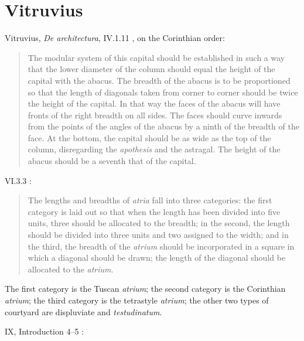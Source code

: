 \documentclass{amsart}
\theoremstyle{definition}
\begin{document}
\section{Vitruvius}
Vitruvius, {\em De architectura}, IV.1.11 \cite[p.~93]{vitruvius}, on the Corinthian order:

\begin{quote}
The modular system of this capital should be established in such a way that the lower diameter of the column should equal the height of the capital
with the abacus. The breadth of the abacus is to be proportioned so that the length of diagonals taken from corner to corner should be twice the height of the
capital. In that way the faces of the abacus will have fronts of the right breadth on all sides. The faces should curve inwards from the points of the angles of the abacus
by a ninth of the breadth of the face. At the bottom, the capital should be as wide as the top of the column, disregarding the {\em apothesis} and the astragal.
The height of the abacus should be a seventh that of the capital.
\end{quote}

VI.3.3 \cite[p.~172]{vitruvius}:

\begin{quote}
The lengths and breadths of {\em atria} fall into three categories: the first category is laid out so that when the length
has been divided into five units, three should be allocated to the breadth; in the second, the length should be divided
into three units and two assigned to the width; and in the third, the breadth of the {\em atrium} should be incorporated
in a square in which a diagonal should be drawn; the length of the diagonal should be allocated to the
{\em atrium}.
\end{quote}

The first category is the Tuscan {\em atrium}; the second category is the Corinthian {\em atrium}; 
the third category is the tetrastyle {\em atrium}; the other two types of courtyard are displuviate and {\em testudinatum}.

IX, Introduction 4--5 \cite[p.~243]{vitruvius}:
\end{document}
